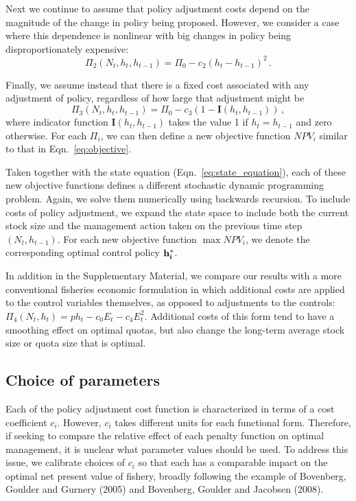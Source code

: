 \documentclass{article}\usepackage[]{graphicx}\usepackage[]{color}
\begin{document}
Next we continue to assume that policy adjustment costs depend on the magnitude of the change in policy being proposed. However, we consider a case where this dependence is nonlinear with big changes in policy being disproportionately expensive:
\begin{equation}
  \Pi_{2}(N_t,h_t, h_{t-1}) = \Pi_0 - c_2 (  h_t - h_{t-1})^2 \,.
\end{equation}

Finally, we assume instead that there is a fixed cost associated with any adjustment of policy, regardless of how large that adjustment might be
\begin{equation}
  \Pi_{3}(N_t,h_t, h_{t-1}) = \Pi_0 - c_3 (1-\mathbf{I}(h_t, h_{t-1}))  \,,
\end{equation}
where indicator function $\mathbf{I}(h_t, h_{t-1})$ takes the value 1 if $h_t=h_{t-1}$ and zero otherwise. For each $\Pi_i$, we can then define a new objective function $NPV_i$ similar to that in Eqn.~\ref{eq:objective}. 

Taken together with the state equation (Eqn.~\ref{eq:state_equation}), each of these new objective functions defines a different stochastic dynamic programming problem. Again, we solve them numerically using backwards recursion.  To include costs of policy adjustment, we expand the state space to include both the current stock size and the management action taken on the previous time step $(N_t,h_{t-1})$. For each new objective function $\max NPV_i$, we denote the corresponding optimal control policy $ {\bf h_i^*} $.

In addition in the Supplementary Material, we compare our results with a more conventional fisheries economic formulation in which additional costs are applied to the control variables themselves, as opposed to adjustments to the controls: $ \Pi_4 (N_t,h_t) = p h_t -  c_0 E_t-c_4E_t^2$. Additional costs of this form tend to have  a smoothing effect on optimal quotas, but also change the long-term average stock size or quota size that is optimal.

\subsection*{Choice of parameters}

Each of the policy adjustment cost function is characterized in terms
of a cost coefficient $c_i$.  However, $c_i$ takes different units for each  functional form. Therefore, if seeking to compare the relative effect of each penalty function on optimal management, it is unclear what parameter values should be used. To address this issue, we calibrate choices of $c_i$ so that each has a comparable impact on the optimal net present value of fishery, broadly following the example of Bovenberg, Goulder and Gurnery (2005) and Bovenberg, Goulder and Jacobsen (2008).
\end{document}
